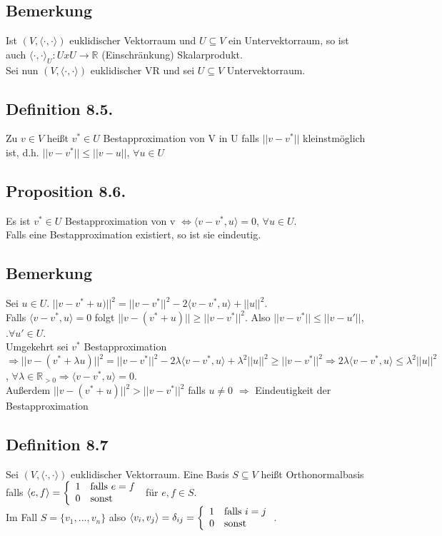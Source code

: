 \documentclass[a4paper, 12pt]{extarticle}
\newcommand{\twopartdef}[4] {
	\left\{
		\begin{array}{ll}
			#1 & #2 \\
			#3 & #4
		\end{array}
	\right.
}
\newcommand{\skalar}[2] {
	\langle #1, #2\rangle
}
\newcommand{\genskalar}{
	\skalar{\cdot }{\cdot }
}
\newcommand{\tn}[1]{\textnormal {#1}}
\begin{document}
\subsection*{Bemerkung}
Ist $(V, \genskalar)$ euklidischer Vektorraum und $U \subseteq V$ ein Untervektorraum, so ist auch $\genskalar_U:UxU \to \mathbb R$ (Einschränkung) Skalarprodukt. \\
Sei nun $(V, \genskalar)$ euklidischer VR und sei $U \subseteq V$ Untervektorraum.
\subsection*{Definition 8.5.} Zu $v\in V$ heißt $v^*\in U$ Bestapproximation von V in U falls $||v-v^*||$ kleinstmöglich ist, d.h. $||v-v^*|| \leq ||v-u||$, $\forall u \in U$
\subsection*{Proposition 8.6.}
Es ist $v^* \in U$ Bestapproximation von v $\Leftrightarrow \skalar{v-v^*}{u} = 0$, $\forall u \in U$. \\
Falls eine Bestapproximation existiert, so ist sie eindeutig.
\subsection*{Bemerkung}
Sei $u \in U$. $||v-v^*+u)||^2 = || v-v^*||^2-2\skalar{v-v^*}{u} + ||u||^2$. \\
Falls $\skalar{v-v^*}{u} = 0$ folgt $||v-(v^*+u)|| \geq ||v-v^*||^2$. Also $||v-v^*|| \leq ||v-u'||$, $.\forall u'\in U$. \\
Umgekehrt sei $v^*$ Bestapproximation $\Rightarrow ||v-(v^*+\lambda u)||^2 = ||v-v^*||^2-2\lambda\skalar{v-v^*}{u} + \lambda^2||u||^2 \geq ||v-v^*||^2 \Rightarrow 2\lambda\skalar{v-v^*}{u} \leq \lambda^2||u||^2$, $\forall \lambda \in \mathbb R_{>0} \Rightarrow \skalar{v-v^*}{u} = 0$. \\
Außerdem $||v-(v^*+u)||^2 > ||v-v^*||^2$ falls $u \neq 0$ $\Rightarrow$ Eindeutigkeit der Bestapproximation
\subsection*{Definition 8.7} 
Sei $(V, \genskalar)$ euklidischer Vektorraum. Eine Basis $S \subseteq V$ heißt Orthonormalbasis falls $\skalar{e}{f} = \twopartdef{1}{\tn{falls }e = f}{0}{\tn{sonst}}$ für $e,f \in S$. \\
Im Fall $S= \{v_1,...,v_n\}$ also $\skalar{v_i}{v_j} = \delta_{ij} = \twopartdef{1}{\tn{falls } i=j}{0}{\tn{sonst}}$.
\end{document}

